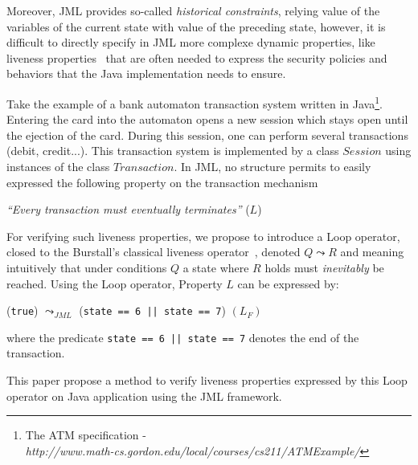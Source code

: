 Moreover, JML provides so-called \textit{historical constraints}, relying 
value of the variables of the current state with value of the
preceding state, however, it is difficult to directly specify in JML 
more complexe dynamic properties, like liveness properties~\cite{lamport77} 
that are often needed to express the security policies
and behaviors that the Java implementation needs to ensure. 

Take the example of a bank
automaton transaction system  
written in Java\footnote{The ATM specification - \\
\textit{http://www.math-cs.gordon.edu/local/courses/cs211/ATMExample/}}.
Entering the card into the automaton opens 
a new session which stays open until the ejection of the card. During
this session, one can perform several transactions (debit, credit...).
This transaction system  is implemented by a class $Session$
 using instances of the class $Transaction$.
In JML, no structure 
permits to easily expressed the following property on the 
transaction mechanism %
\begin{center} 
\textit{``Every transaction must eventually terminates''} 
\qquad ($L$)
\end{center}
For verifying such liveness properties, we propose to introduce a
 \textsf{Loop} operator, closed to 
the Burstall's classical liveness
operator~\cite{burstall}, denoted $Q \leadsto R $ and
 meaning intuitively that  under conditions $Q$ a state where
$R$ holds must \textit{inevitably} be reached.
Using the \textsf{Loop} operator, Property $L$ can be expressed by:
\begin{center}
(\texttt{true}) $\leadsto_{JML}$ (\texttt{state == 6 || state == 7}) $(L_F)$\\
\end{center}
where  the predicate \texttt{state == 6 || state == 7} denotes the end
of the transaction.

This paper propose a method to verify liveness properties expressed by
this  \textsf{Loop} operator on Java application using the JML framework.



